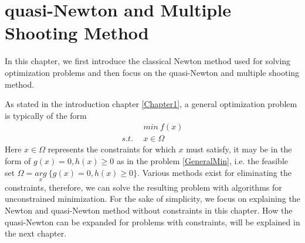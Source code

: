 \chapter{quasi-Newton and Multiple Shooting Method}
In this chapter, we first introduce the classical Newton method used for solving optimization problems and then focus on the quasi-Newton and multiple shooting method. 

As stated in the introduction chapter \ref{Chapter1}, a general optimization problem is typically of the form 
\begin{equation}
	\begin{aligned}
		\  \  \ & min \  f(x) \\
		s.t.\ \  & x \in \Omega
	\end{aligned}
	\label{OptGen}
\end{equation}
Here $x \in \Omega$ represents the constraints for which $x$ must satisfy, it may be in the form of $ g(x) = 0,  h(x)  \geq  0$ as in the problem \ref{GeneralMin}, i.e. the feasible set $\Omega = \underset{x}{arg} \ \{ g(x) = 0,  h(x)  \geq  0 \}$. Various methods exist for eliminating the constraints, therefore, we can solve the resulting problem with algorithms for unconstrained minimization. For the sake of simplicity, we focus on explaining the Newton and quasi-Newton method without constraints in this chapter. How the quasi-Newton can be expanded for problems with constraints, will be explained in the next chapter. 



